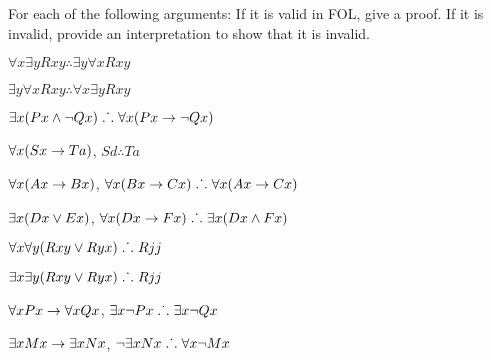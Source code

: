\problempart
\label{pr.QLvalidornot}
For each of the following arguments: If it is valid in FOL, give a proof. If it is invalid, provide an interpretation to show that it is invalid.
\begin{earg}
\item $\forall x\exists y Rxy \therefore  \exists y\forall x Rxy$
\item $\exists y\forall x Rxy \therefore  \forall x\exists y Rxy$
\item $\exists x(Px \wedge \neg Qx) \mathrel{\ldotp\dot{}\,\ldotp}  \forall x(Px \rightarrow \neg Qx)$
\item $\forall x(Sx \rightarrow Ta)$, $Sd \therefore Ta$
\item $\forall x(Ax\rightarrow Bx)$, $\forall x(Bx \rightarrow Cx) \mathrel{\ldotp\dot{}\,\ldotp}  \forall x(Ax \rightarrow Cx)$
\item $\exists x(Dx \vee Ex)$, $\forall x(Dx \rightarrow Fx) \mathrel{\ldotp\dot{}\,\ldotp}  \exists x(Dx \wedge Fx)$
\item $\forall x\forall y(Rxy \vee Ryx)\mathrel{\ldotp\dot{}\,\ldotp}  Rjj$
\item $\exists x\exists y(Rxy \vee Ryx)\mathrel{\ldotp\dot{}\,\ldotp} Rjj$
\item $\forall x Px \rightarrow \forall x Qx$, $\exists x \neg Px\mathrel{\ldotp\dot{}\,\ldotp} \exists x \neg Qx$
\item $\exists x Mx \rightarrow \exists x Nx$, $\neg \exists x Nx\mathrel{\ldotp\dot{}\,\ldotp}  \forall x \neg Mx$
\end{earg}
